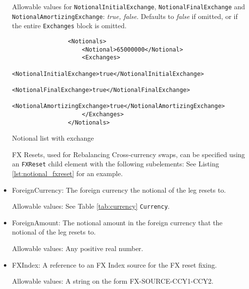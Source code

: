 \begin{itemize}
Allowable values for \lstinline!NotionalInitialExchange!,  \lstinline!NotionalFinalExchange! and \lstinline!NotionalAmortizingExchange!:   \emph{true, false}. Defaults to  \emph{false} if omitted, or if the entire \lstinline!Exchanges! block is omitted.

\begin{listing}[H]
\begin{verbatim}
                <Notionals>
                    <Notional>65000000</Notional>
                    <Exchanges>
                      <NotionalInitialExchange>true</NotionalInitialExchange>
                      <NotionalFinalExchange>true</NotionalFinalExchange>
                      <NotionalAmortizingExchange>true</NotionalAmortizingExchange>
                    </Exchanges>
                </Notionals>
\end{verbatim}
\caption{Notional list with exchange}
\label{lst:notional_exchange}
\end{listing}

FX Resets,  used for Rebalancing Cross-currency swaps, can be specified using an \lstinline!FXReset! child element with the following subelements:  See Listing \ref{lst:notional_fxreset} for an example. \break

\item ForeignCurrency: The foreign currency the notional of the leg resets to.  

Allowable values:  See Table \ref{tab:currency} \lstinline!Currency!.

\item ForeignAmount: The notional amount in the foreign currency that the notional of the leg resets to.  

Allowable values:  Any positive real number.

\item FXIndex: A reference to an FX Index source for the FX reset fixing. 

Allowable values:  A string on the form FX-SOURCE-CCY1-CCY2.








\end{itemize}
